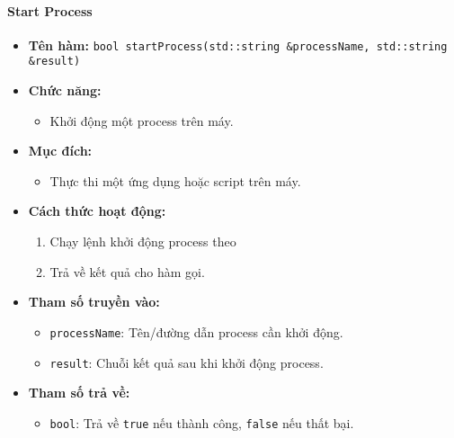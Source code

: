 \paragraph{Start Process}
\begin{itemize}
    \item \textbf{Tên hàm:} \texttt{bool startProcess(std::string \&processName, std::string \&result)}
    \item \textbf{Chức năng:}
    \begin{itemize}
        \item Khởi động một process trên máy.
    \end{itemize}
    \item \textbf{Mục đích:}
    \begin{itemize}
        \item Thực thi một ứng dụng hoặc script trên máy.
    \end{itemize}
    \item \textbf{Cách thức hoạt động:}
    \begin{enumerate}
        \item Chạy lệnh khởi động process theo
        \item Trả về kết quả cho hàm gọi.
    \end{enumerate}
    \item \textbf{Tham số truyền vào:}
    \begin{itemize}
        \item \texttt{processName}: Tên/đường dẫn process cần khởi động.
        \item \texttt{result}: Chuỗi kết quả sau khi khởi động process.
    \end{itemize}
    \item \textbf{Tham số trả về:}
    \begin{itemize}
        \item \texttt{bool}: Trả về \texttt{true} nếu thành công, \texttt{false} nếu thất bại.
    \end{itemize}
\end{itemize}

